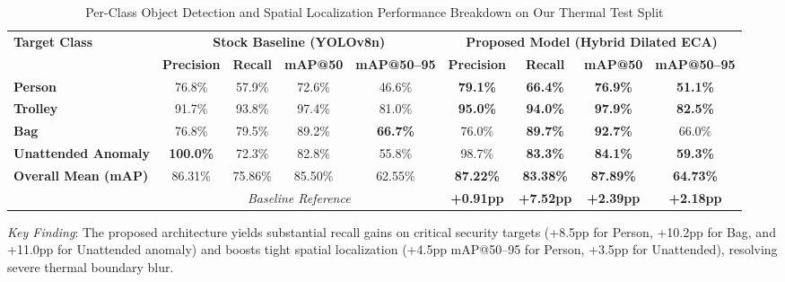 ﻿%

\begin{table}[t]
\centering
\caption{Per-Class Object Detection and Spatial Localization Performance Breakdown on Our Thermal Test Split}
\label{tab:per_class_breakdown}
\small
\renewcommand{\arraystretch}{1.22}
\setlength{\tabcolsep}{11pt}
\begin{tabular}{l cccc cccc}
\toprule
\multirow{2}{*}{\textbf{Target Class}} & 
\multicolumn{4}{c}{\textbf{Stock Baseline (YOLOv8n)}} & 
\multicolumn{4}{c}{\textbf{Proposed Model (Hybrid Dilated ECA)}} \\
\cmidrule(lr){2-5} \cmidrule(lr){6-9}
& \textbf{Precision} & \textbf{Recall} & \textbf{mAP@50} & \textbf{mAP@50--95} 
& \textbf{Precision} & \textbf{Recall} & \textbf{mAP@50} & \textbf{mAP@50--95} \\
\midrule
\textbf{Person}             & 76.8\% & 57.9\% & 72.6\% & 46.6\% & \textbf{79.1\%} & \textbf{66.4\%} & \textbf{76.9\%} & \textbf{51.1\%} \\
\textbf{Trolley}            & 91.7\% & 93.8\% & 97.4\% & 81.0\% & \textbf{95.0\%} & \textbf{94.0\%} & \textbf{97.9\%} & \textbf{82.5\%} \\
\textbf{Bag}                & 76.8\% & 79.5\% & 89.2\% & \textbf{66.7\%} & 76.0\% & \textbf{89.7\%} & \textbf{92.7\%} & 66.0\% \\
\textbf{Unattended Anomaly} & \textbf{100.0\%} & 72.3\% & 82.8\% & 55.8\% & 98.7\% & \textbf{83.3\%} & \textbf{84.1\%} & \textbf{59.3\%} \\
\midrule
\rowcolor{gray!12}
\textbf{Overall Mean (mAP)} & 86.31\% & 75.86\% & 85.50\% & 62.55\% & \textbf{87.22\%} & \textbf{83.38\%} & \textbf{87.89\%} & \textbf{64.73\%} \\
\rowcolor{gray!06}
\multicolumn{1}{l}{\textit{Improvement ($\Delta$)}} & \multicolumn{4}{c}{\textit{Baseline Reference}} & \textbf{+0.91pp} & \textbf{+7.52pp} & \textbf{+2.39pp} & \textbf{+2.18pp} \\
\bottomrule
\end{tabular}
\vspace{1ex}
{\raggedright \footnotesize \textit{Key Finding}: The proposed architecture yields substantial recall gains on critical security targets (+8.5pp for Person, +10.2pp for Bag, and +11.0pp for Unattended anomaly) and boosts tight spatial localization (+4.5pp mAP@50--95 for Person, +3.5pp for Unattended), resolving severe thermal boundary blur.\par}
\end{table}
